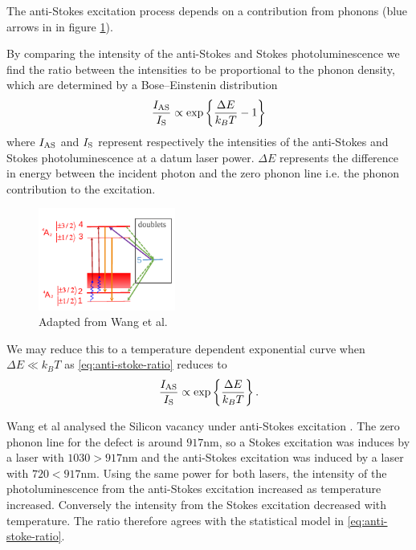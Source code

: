 The anti-Stokes excitation process depends on a contribution from phonons (blue arrows in in figure \ref{fig:anti-stokes}).

By comparing the intensity of the anti-Stokes and Stokes photoluminescence we find the ratio between the intensities to be proportional to the phonon density, which are determined by a Bose–Einstenin distribution \cite{Wang2018}
\begin{equation}
	\frac{I_{\ce{AS}}}{I_{\ce{S}}} \propto \exp\left\{\frac{\Delta E}{k_B T} -1 \right\}
	\label{eq:anti-stoke-ratio}
\end{equation}
where $I_{\ce{AS}}$ and $I_{\ce{S}}$ represent respectively the intensities of the anti-Stokes and Stokes photoluminescence at a datum laser power. $\Delta E$ represents the difference in energy between the incident photon and the zero phonon line i.e. the phonon contribution to the excitation.

\begin{figure}%
	\centering%
	\includegraphics[width=0.4\textwidth]{figures/stokes.pdf}
	\caption{Adapted from Wang et al.}\label{fig:anti-stokes}
\end{figure}%

We may reduce this to a temperature dependent exponential curve when $\Delta E \ll k_B T$ as \eqref{eq:anti-stoke-ratio} reduces to
\begin{equation}
	\frac{I_{\ce{AS}}}{I_{\ce{S}}} \propto \exp\left\{\frac{\Delta E}{k_B T} \right\}.
	\label{eq:anti-stokes-ratio-reduced}
\end{equation}

Wang et al analysed the Silicon vacancy under anti-Stokes excitation \cite{Wang2021}. The zero phonon line for the defect is around $917$nm, so a Stokes excitation was induces by a laser with $1030 > 917$nm and the anti-Stokes excitation was induced by a laser with $720 < 917$nm. Using the same power for both lasers, the intensity of the photoluminescence from the anti-Stokes excitation increased as temperature increased. Conversely the intensity from the Stokes excitation decreased with temperature. The ratio therefore agrees with the statistical model in \eqref{eq:anti-stoke-ratio}.

